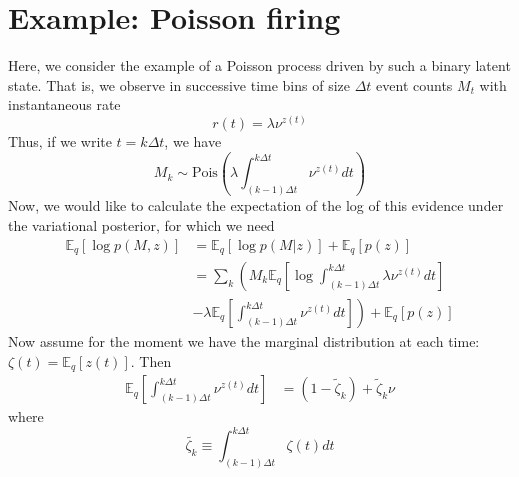 \documentclass[11pt]{article}
\begin{document}
\section{Example: Poisson firing}
Here, we consider the example of a Poisson process driven by such a binary latent state. That is, we observe in successive time bins of size $\Delta t$ event counts $M_t$ with instantaneous rate
\begin{equation}
    r(t) = \lambda \nu^{z(t)}
\end{equation}
Thus, if we write $t = k\Delta t$, we have
\begin{equation}
    M_k \sim \text{Pois}\left(\lambda \int_{(k - 1)\Delta t}^{k\Delta t} \nu^{z(t)} dt\right)
\end{equation}
Now, we would like to calculate the expectation of the log of this evidence under the variational posterior, for which we need
\begin{align}
    \mathbb{E}_q[\log p(M, z)] &= \mathbb{E}_q[\log p(M|z)] + \mathbb{E}_q[p(z)] \\
    &= \sum_k \left(M_k \mathbb{E}_q \left[ \log \int_{(k - 1)\Delta t}^{k\Delta t} \lambda \nu^{z(t)} dt \right] \right. \\
    &- \left.\lambda \mathbb{E}_q\left[ \int_{(k - 1)\Delta t}^{k\Delta t} \nu^{z(t)} dt\right]\right)
    + \mathbb{E}_q[p(z)]
\end{align}
Now assume for the moment we have the marginal distribution at each time: $\zeta(t) = \mathbb{E}_q[z(t)]$. Then
\begin{align}
    \mathbb{E}_q\left[ \int_{(k - 1)\Delta t}^{k\Delta t} \nu^{z(t)} dt\right] &=  (1 - \tilde{\zeta}_k) + \tilde{\zeta}_k \nu
\end{align}
where
\begin{equation}
    \tilde{\zeta_k} \equiv \int_{(k - 1)\Delta t}^{k\Delta t} \zeta(t) dt
\end{equation}
\end{document}
